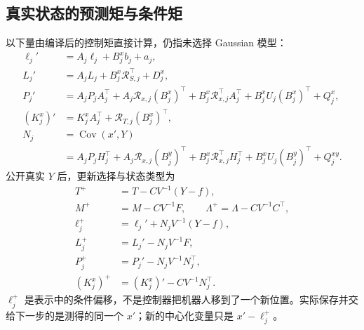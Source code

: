 \documentclass[UTF8,fontset=fandol,zihao=5,a4paper]{ctexart}
\DeclareMathOperator{\Cov}{Cov}\DeclareMathOperator{\im}{im}
\theoremstyle{definition}
\theoremstyle{remark}\newtheorem{remark}[theorem]{说明}
\numberwithin{equation}{section}
\begin{document}
\subsection{真实状态的预测矩与条件矩}
以下量由编译后的控制矩直接计算，仍指未选择 Gaussian 模型：
\begin{align}
\ell_j'&=A_j\ell_j+B_j^xb_j+a_j,\\
L_j'&=A_jL_j+B_j^x\mathcal R_{S,j}^\top+D_j^x,\label{eq:stateLprime}\\
P_j'&=A_jP_jA_j^\top+A_j\mathcal R_{x,j}(B_j^x)^\top
+B_j^x\mathcal R_{x,j}^\top A_j^\top+B_j^xU_j(B_j^x)^\top+Q_j^x,\\
(K_j^x)'&=K_j^xA_j^\top+\mathcal R_{T,j}(B_j^x)^\top,\\
N_j&=\Cov(x',Y)\nonumber\\
&=A_jP_jH_j^\top+A_j\mathcal R_{x,j}(B_j^y)^\top
+B_j^x\mathcal R_{x,j}^\top H_j^\top+B_j^xU_j(B_j^y)^\top+Q_j^{xy}.
\label{eq:stateN}
\end{align}
公开真实 $Y$ 后，更新选择与状态类型为
\begin{align}
T^+&=T-CV^{-1}(Y-f),\nonumber\\
M^+&=M-CV^{-1}F,\qquad\Lambda^+=\Lambda-CV^{-1}C^\top,\label{eq:stateTM}\\
\ell_j^+&=\ell_j'+N_jV^{-1}(Y-f),\label{eq:ellplus}\\
L_j^+&=L_j'-N_jV^{-1}F,\label{eq:Lplus}\\
P_j^+&=P_j'-N_jV^{-1}N_j^\top,\label{eq:Pplus}\\
(K_j^x)^+&=(K_j^x)'-CV^{-1}N_j^\top.\label{eq:Kplus}
\end{align}
$\ell_j^+$ 是表示中的条件偏移，不是控制器把机器人移到了一个新位置。实际保存并交给下一步的是测得的同一个 $x'$；新的中心化变量只是 $x'-\ell_j^+$。
\end{document}
